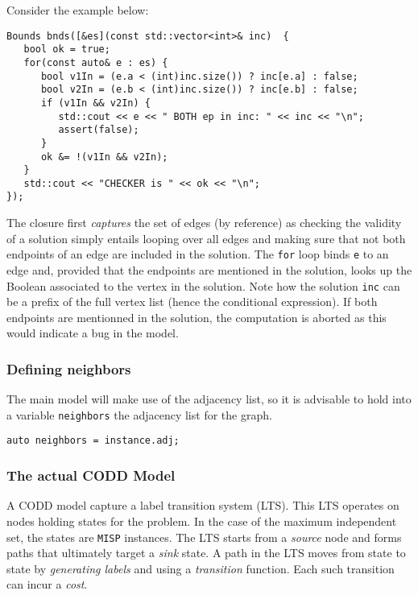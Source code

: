 \documentclass[11pt]{article}
\begin{document}
Consider the example below:
\begin{verbatim}
Bounds bnds([&es](const std::vector<int>& inc)  {
   bool ok = true;    
   for(const auto& e : es) {         
      bool v1In = (e.a < (int)inc.size()) ? inc[e.a] : false;
      bool v2In = (e.b < (int)inc.size()) ? inc[e.b] : false;
      if (v1In && v2In) {
         std::cout << e << " BOTH ep in inc: " << inc << "\n";
         assert(false);
      }
      ok &= !(v1In && v2In);
   }
   std::cout << "CHECKER is " << ok << "\n";
});
\end{verbatim}
The closure first \emph{captures} the set of edges (by reference) as checking the validity of a solution simply entails looping over all edges and making sure that not both endpoints of an edge are included in the solution. The \texttt{for} loop binds \texttt{e} to an edge and, provided that the endpoints are mentioned in the solution, looks up the Boolean associated to the vertex in the solution. Note how the solution \texttt{inc} can be a prefix of the full vertex list (hence the conditional expression). If both endpoints are mentionned in the solution, the computation is aborted as this would indicate a bug in the model. 

\subsubsection{Defining neighbors}
\label{sec:orgc7c48ad}

The main model will make use of the adjacency list, so it is advisable to hold into
a variable \texttt{neighbors} the adjacency list for the graph.
\begin{verbatim}
auto neighbors = instance.adj;
\end{verbatim}

\subsubsection{The actual CODD Model}
\label{sec:org2f3948b}

A CODD model capture a label transition system (LTS). This LTS operates on nodes holding states for the problem. In the case of the maximum independent set, the states are \texttt{MISP} instances. The LTS starts from a \emph{source} node and forms paths that ultimately target a \emph{sink} state. A path in the LTS moves from state to state by \emph{generating labels} and  using a \emph{transition} function. Each such transition can incur a \emph{cost}.
\end{document}

